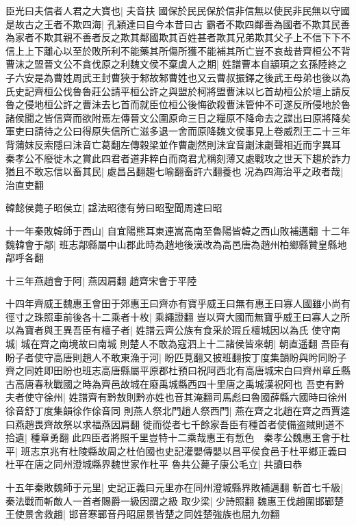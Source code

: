 臣光曰夫信者人君之大寶也|{
	夫音扶}
國保於民民保於信非信無以使民非民無以守國是故古之王者不欺四海|{
	孔穎達曰自今本昔曰古}
霸者不欺四鄰善為國者不欺其民善為家者不欺其親不善者反之欺其鄰國欺其百姓甚者欺其兄弟欺其父子上不信下下不信上上下離心以至於敗所利不能藥其所傷所獲不能補其所亡豈不哀哉昔齊桓公不背曹沫之盟晉文公不貪伐原之利魏文侯不棄虞人之期|{
	姓譜曹本自顓頊之玄孫陸終之子六安是為曹姓周武王封曹狹于邾故邾曹姓也又云曹叔振鐸之後武王母弟也後以為氏史記齊桓公伐魯魯莊公請平桓公許之與盟於柯將盟曹沫以匕首劫桓公於壇上請反魯之侵地桓公許之曹沬去匕首而就臣位桓公後悔欲殺曹沬管仲不可遂反所侵地於魯諸侯聞之皆信齊而欲附焉左傳晉文公圍原命三日之糧原不降命去之諜出曰原將降矣軍吏曰請待之公曰得原失信所亡滋多退一舍而原降魏文侯事見上卷威烈王二十三年背蒲妺反索隱曰沬音亡葛翻左傳穀梁並作曹劌然則沬宜音劌沬劌聲相近而字異耳}
秦孝公不廢徙木之賞此四君者道非粹白而商君尤稱刻薄又處戰攻之世天下趨於詐力猶且不敢忘信以畜其民|{
	處昌呂翻趨七喻翻畜許六翻養也}
况為四海治平之政者哉|{
	治直吏翻}


韓懿侯薨子昭侯立|{
	諡法昭德有勞曰昭聖聞周達曰昭}


十一年秦敗韓師于西山|{
	自宜陽熊耳東連嵩高南至魯陽皆韓之西山敗補邁翻}
十二年魏韓會于鄗|{
	班志鄗縣屬中山郡此時為趙地後漢改為高邑唐為趙州柏鄉縣贊皇縣地鄗呼各翻}


十三年燕趙會于阿|{
	燕因肩翻}
趙齊宋會于平陸

十四年齊威王魏惠王會田于郊惠王曰齊亦有寶乎威王曰無有惠王曰寡人國雖小尚有徑寸之珠照車前後各十二乘者十枚|{
	乘繩證翻}
豈以齊大國而無寶乎威王曰寡人之所以為寶者與王異吾臣有檀子者|{
	姓譜云齊公族有食采於瑕丘檀城因以為氏}
使守南城|{
	城在齊之南境故曰南城}
則楚人不敢為寇泗上十二諸侯皆來朝|{
	朝直遥翻}
吾臣有盼子者使守高唐則趙人不敢東漁于河|{
	盼匹莧翻又披班翻按丁度集韻盼與盻同盼子齊之同姓即田盼也班志高唐縣屬平原郡杜預曰祝阿西北有高唐城宋白曰齊州章丘縣古高唐春秋戰國之時為齊邑故城在廢禹城縣西四十里唐之禹城漢祝阿也}
吾吏有黔夫者使守徐州|{
	姓譜齊有黔敖則黔亦姓也音其淹翻司馬彪曰魯國薛縣六國時曰徐州徐音舒丁度集韻徐作俆音同}
則燕人祭北門趙人祭西門|{
	燕在齊之北趙在齊之西賈逵曰燕趙畏齊故祭以求福燕因肩翻}
徙而從者七千餘家吾臣有種首者使備盗賊則道不拾遺|{
	種章勇翻}
此四臣者將照千里豈特十二乘哉惠王有慙色　秦孝公魏惠王會于杜平|{
	班志京兆有杜陵縣故周之杜伯國也史記灌嬰傳嬰以昌平侯食邑于杜平鄉正義曰杜平在唐之同州澄城縣界魏世家作杜平}
魯共公薨子康公毛立|{
	共讀曰恭}


十五年秦敗魏師于元里|{
	史記正義曰元里亦在同州澄城縣界敗補邁翻}
斬首七千級|{
	秦法戰而斬敵人一首者賜爵一級因謂之級}
取少梁|{
	少詩照翻}
魏惠王伐趙圍邯鄲楚王使景舍救趙|{
	邯音寒鄲音丹昭屈景皆楚之同姓楚強族也屈九勿翻}


